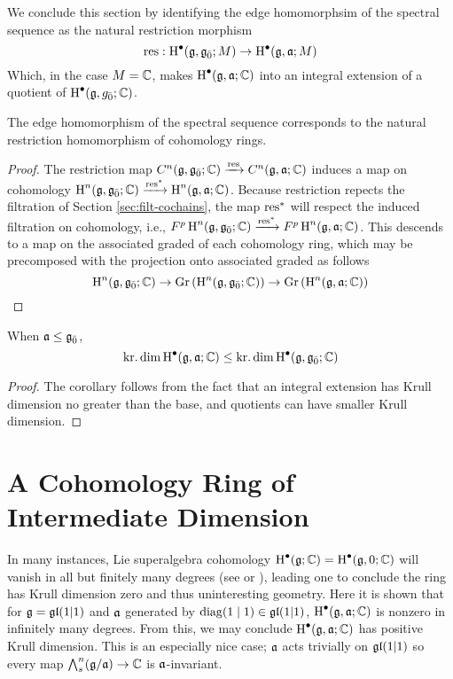 We conclude this section by identifying the edge homomorphsim of the spectral sequence as the natural restriction morphism
\begin{equation}
  \label{eq:restriction}
  \operatorname{res}: \operatorname{H}^\bullet(\mathfrak{g},{\mathfrak{g}}_{\bar{0}};M) \to \operatorname{H}^\bullet(\mathfrak{g},\mathfrak{a};M)
\end{equation}
Which, in the case $M = \mathbb{C}$, makes $\operatorname{H}^\bullet(\mathfrak{g},\mathfrak{a};\mathbb{C})$ into an integral extension of a quotient of $\operatorname{H}^\bullet(\mathfrak{g},{g}_{\bar{0}};\mathbb{C})$.

\begin{proposition}\label{prop:edge}
  The edge homomorphism of the spectral sequence corresponds to the natural restriction homomorphism of cohomology rings.
\end{proposition}
\begin{proof}
The restriction map $C^n(\mathfrak{g},{\mathfrak{g}}_{\bar{0}};\mathbb{C}) \xrightarrow{\operatorname{res}} C^n(\mathfrak{g},\mathfrak{a};\mathbb{C})$ induces a map on cohomology $\operatorname{H}^n(\mathfrak{g},{\mathfrak{g}}_{\bar{0}};\mathbb{C}) \xrightarrow{\operatorname{res}^*} \operatorname{H}^n(\mathfrak{g},\mathfrak{a};\mathbb{C})$. Because restriction repects the filtration of Section \ref{sec:filt-cochains}, the map $\operatorname{res}^*$ will respect the induced filtration on cohomology, i.e., $F^p \operatorname{H}^n(\mathfrak{g},{\mathfrak{g}}_{\bar{0}};\mathbb{C}) \xrightarrow{\operatorname{res}^*} F^p\operatorname{H}^n(\mathfrak{g},\mathfrak{a};\mathbb{C})$. This descends to a map on the associated graded of each cohomology ring, which may be precomposed with the projection onto associated graded as follows
  \[
    \operatorname{H}^n(\mathfrak{g},{\mathfrak{g}}_{\bar{0}};\mathbb{C}) \to \operatorname{Gr}\left(\operatorname{H}^n(\mathfrak{g},{\mathfrak{g}}_{\bar{0}};\mathbb{C}) \right) \to \operatorname{Gr}\left( \operatorname{H}^n(\mathfrak{g},\mathfrak{a};\mathbb{C}) \right)
  \]

\end{proof}

\begin{corollary}
  When $\mathfrak{a} \leq {\mathfrak{g}}_{\bar{0}}$,
  \[
    \operatorname{kr.dim} \operatorname{H}^\bullet(\mathfrak{g},\mathfrak{a};\mathbb{C}) \leq \operatorname{kr.dim}\operatorname{H}^\bullet(\mathfrak{g},{\mathfrak{g}}_{\bar{0}};\mathbb{C})
  \]
  
\end{corollary}
\begin{proof}
  The corollary follows from the fact that an integral extension has Krull dimension no greater than the base, and quotients can have smaller Krull dimension.
\end{proof}



\section{A Cohomology Ring of Intermediate Dimension}
\label{sec:int-dim}

  In many instances, Lie superalgebra cohomology $\operatorname{H}^\bullet(\mathfrak{g};\mathbb{C}) = \operatorname{H}^\bullet(\mathfrak{g},0;\mathbb{C})$ will vanish in all but finitely many degrees (see \cite{fuks-leites} or \cite[Th\'eor\`eme 5.3]{MR1450424}), leading one to conclude the ring has Krull dimension zero and thus uninteresting geometry. Here it is shown that for $\mathfrak{g} = \mathfrak{gl}(1|1)$ and $\mathfrak{a}$ generated by $\operatorname{diag}(1 \mid 1) \in \mathfrak{gl}(1|1)$, $\operatorname{H}^\bullet(\mathfrak{g},\mathfrak{a};\mathbb{C})$ is nonzero in infinitely many degrees. From this, we may conclude $\operatorname{H}^\bullet(\mathfrak{g},\mathfrak{a};\mathbb{C})$ has positive Krull dimension. This is an especially nice case; $\mathfrak{a}$ acts trivially on $\mathfrak{gl}(1|1)$ so every map $\bigwedge\nolimits^{n}_s(\mathfrak{g}/\mathfrak{a}) \to \mathbb{C}$ is $\mathfrak{a}$-invariant.

